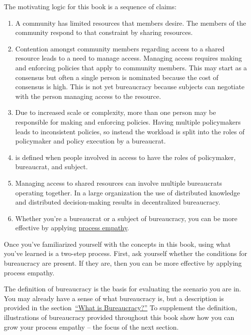 The motivating logic for this book is a sequence of claims:
\begin{enumerate}
    \item A community has limited resources that members desire. The members of the community respond to that constraint by sharing resources.
    \item Contention amongst community members regarding access to a \gls{shared resource} leads to a need to manage access.  
    \iftoggle{glossaryinmargin}{\marginpar{[Glossary]}}{}%
    Managing access requires making and enforcing policies that apply to community members. This may start as a consensus but often a single person is nominated because the cost of consensus is high. This is not yet bureaucracy because subjects can negotiate with the person managing access to the resource.
    \item Due to increased scale or complexity, more than one person may be responsible for making and enforcing policies. Having multiple policymakers leads to inconsistent policies, so instead the workload is split into the roles of policymaker and policy execution by a bureaucrat. 
    \item 
\iftoggle{glossarysubstitutionworks}{\Gls{bureaucracy}}{Bureaucracy}
is defined when people involved in access to 
\iftoggle{glossarysubstitutionworks}{\glspl{shared resource}}{shared resources} have the roles of policymaker, bureaucrat, and subject.
    \item Managing access to shared resources can involve multiple bureaucrats operating together. In a large organization the use of distributed knowledge and distributed decision-making results in \gls{decentralized bureaucracy}.
    \item Whether you're a \gls{bureaucrat} 
    \iftoggle{glossaryinmargin}{\marginpar{[Glossary]}}{}%
    or a subject of bureaucracy, you can be more effective by applying \hyperref[sec:process-empathy]{process empathy}.
\end{enumerate}

Once you've familiarized yourself with the concepts in this book, using what you've learned is a two-step process. First, ask yourself whether the conditions for bureaucracy are present. If they are, then you can be more effective by applying process empathy.

The definition of bureaucracy is the basis for evaluating the scenario you are in. You may already have a sense of what bureaucracy is, but a description is provided %
\iftoggle{haspagenumbers}{ on page~\pageref{sec:define-bureaucracy}}{} 
in the section~\hyperref[sec:define-bureaucracy]{``What is Bureaucracy?''} To supplement the definition, illustrations of bureaucracy provided throughout this book show how you can grow your process empathy -- the focus of the next section. 